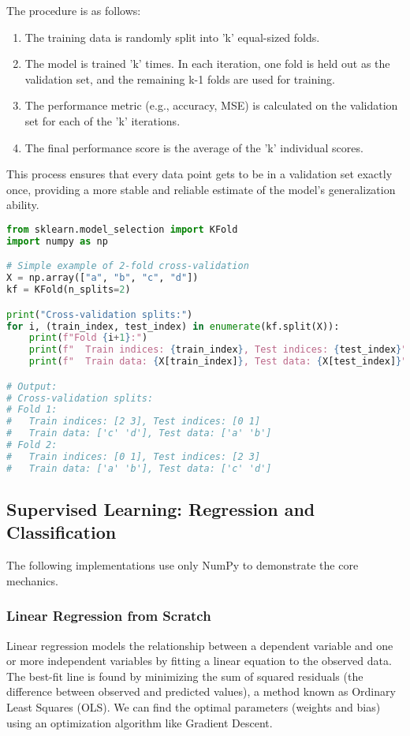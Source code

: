 \documentclass[11pt,a4paper]{article}
\begin{document}
The procedure is as follows:
\begin{enumerate}
    \item The training data is randomly split into 'k' equal-sized folds.
    \item The model is trained 'k' times. In each iteration, one fold is held out as the validation set, and the remaining k-1 folds are used for training.
    \item The performance metric (e.g., accuracy, MSE) is calculated on the validation set for each of the 'k' iterations.
    \item The final performance score is the average of the 'k' individual scores.
\end{enumerate}

This process ensures that every data point gets to be in a validation set exactly once, providing a more stable and reliable estimate of the model's generalization ability.

\begin{lstlisting}[language=Python]
from sklearn.model_selection import KFold
import numpy as np

# Simple example of 2-fold cross-validation
X = np.array(["a", "b", "c", "d"])
kf = KFold(n_splits=2)

print("Cross-validation splits:")
for i, (train_index, test_index) in enumerate(kf.split(X)):
    print(f"Fold {i+1}:")
    print(f"  Train indices: {train_index}, Test indices: {test_index}")
    print(f"  Train data: {X[train_index]}, Test data: {X[test_index]}")

# Output:
# Cross-validation splits:
# Fold 1:
#   Train indices: [2 3], Test indices: [0 1]
#   Train data: ['c' 'd'], Test data: ['a' 'b']
# Fold 2:
#   Train indices: [0 1], Test indices: [2 3]
#   Train data: ['a' 'b'], Test data: ['c' 'd']
\end{lstlisting}

\subsection{Supervised Learning: Regression and Classification}

The following implementations use only NumPy to demonstrate the core mechanics.

\subsubsection{Linear Regression from Scratch}

Linear regression models the relationship between a dependent variable and one or more independent variables by fitting a linear equation to the observed data. The best-fit line is found by minimizing the sum of squared residuals (the difference between observed and predicted values), a method known as Ordinary Least Squares (OLS). We can find the optimal parameters (weights and bias) using an optimization algorithm like Gradient Descent.
\end{document}
